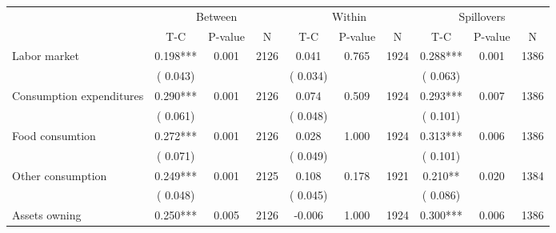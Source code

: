 
\begin{tabular}{l*{9}{c}}\hline&\multicolumn{3}{c}{Between}&\multicolumn{3}{c}{Within}&\multicolumn{3}{c}{Spillovers} \\ \cmidrule(r){2-4}\cmidrule(l){5-7}\cmidrule(l){8-10} & {T-C} & {P-value} & {N} & {T-C} & {P-value} & {N}  & {T-C} & {P-value} & {N}  \\ \midrule
 Labor market                 &              0.198***          &        0.001 & 2126          &              0.041          &        0.765 & 1924          &        0.288*** &        0.001 & 1386                 \\ 
                               &        (       0.043) & &                                                                 &       (       0.034) & &                                                          &       (       0.063)      & &     \\ 
 Consumption expenditures                 &              0.290***          &        0.001 & 2126          &              0.074 &        0.509 & 1924                   &        0.293*** &        0.007 & 1386                 \\ 
                               &        (       0.061) & &                                                                 &       (       0.048) & &                                                          &       (       0.101) & &  \\ 
 Food consumtion                 &              0.272***          &        0.001 & 2126          &              0.028 &        1.000 & 1924                   &        0.313*** &        0.006 & 1386                 \\ 
                               &        (       0.071) & &                                                                 &       (       0.049) & &                                                          & (       0.101)                                    \\ 
 Other consumption                 &              0.249***          &        0.001 & 2125          &              0.108 &        0.178 & 1921                   &        0.210** &        0.020 & 1384                 \\ 
                               &        (       0.048) & &                                                                 &       (       0.045) & &                                                          &       (       0.086) & &   \\ 
 Assets owning                 &              0.250***          &        0.005 & 2126          &             -0.006 &        1.000 & 1924                   &        0.300*** &        0.006 & 1386                 \\ 

\end{tabular}
